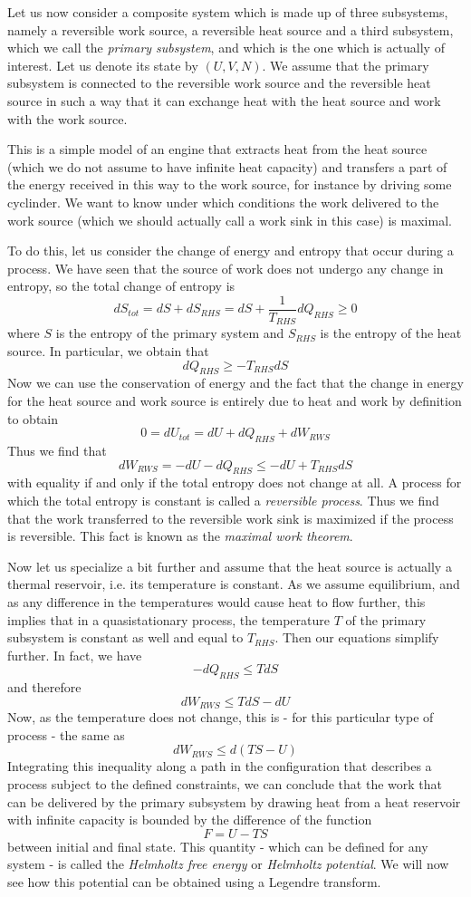 \documentclass[a4paper, draft]{report}
\numberwithin{section}{chapter}
\numberwithin{equation}{chapter}
\theoremstyle{own}
\theoremstyle{remark}
\begin{document}
Let us now consider a composite system which is made up of three subsystems, namely a reversible work source, a reversible heat source and a third subsystem, which we call the {\em primary subsystem}, and which is the one which is actually of interest. Let us denote its state by $(U,V,N)$. We assume that the primary subsystem is connected to the reversible work source and the reversible heat source in such a way that it can exchange heat with the heat source and work with the work source.

This is a simple model of an engine that extracts heat from the heat source (which we do not assume to have infinite heat capacity) and transfers a part of the energy received in this way to the work source, for instance by driving some cyclinder. We want to know under which conditions the work delivered to the work source (which we should actually call a work sink in this case) is maximal.

To do this, let us consider the change of energy and entropy that occur during a process. We have seen that the source of work does not undergo any change in entropy, so the total change of entropy is
$$
dS_{tot} = dS + dS_{RHS} = dS + \frac{1}{T_{RHS}} dQ_{RHS} \geq 0
$$
where $S$ is the entropy of the primary system and $S_{RHS}$ is the entropy of the heat source. In particular, we obtain that
$$
dQ_{RHS} \geq - T_{RHS} dS
$$
Now we can use the conservation of energy and the fact that the change in energy for the heat source and work source is entirely due to heat and work by definition to obtain
$$
0 = dU_{tot} = dU + dQ_{RHS} + dW_{RWS}
$$
Thus we find that
$$
dW_{RWS} = - dU - dQ_{RHS} \leq -dU + T_{RHS} dS
$$
with equality if and only if the total entropy does not change at all. A process for which the total entropy is constant is called a {\em reversible process}. Thus we find that the work transferred to the reversible work sink is maximized if the process is reversible. This fact is known as the {\em maximal work theorem}.

Now let us specialize a bit further and assume that the heat source is actually a thermal reservoir, i.e. its temperature is constant. As we assume equilibrium, and as any difference in the temperatures would cause heat to flow further, this implies that in a quasistationary process, the temperature $T$ of the primary subsystem is constant as well and equal to $T_{RHS}$. Then our equations simplify further. In fact, we have
$$
- dQ_{RHS} \leq T dS
$$
and therefore
$$
dW_{RWS} \leq T dS - dU
$$
Now, as the temperature does not change, this is - for this particular type of process - the same as
$$
dW_{RWS} \leq d (TS - U)
$$
Integrating this inequality along a path in the configuration that describes a process subject to the defined constraints, we can conclude that the work that can be delivered by the primary subsystem by drawing heat from a heat reservoir with infinite capacity is bounded by the difference of the function
$$
F = U - TS
$$
between initial and final state. This quantity - which can be defined for any system - is called the {\em Helmholtz free energy} or {\em Helmholtz potential}. We will now see how this potential can be obtained using a Legendre transform.
\end{document}
